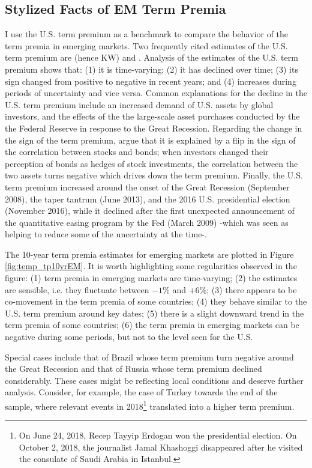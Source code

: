 {\subsection{Stylized Facts of EM Term Premia}
I use the U.S. term premium as a benchmark to compare the behavior of the term premia in emerging markets. Two frequently cited estimates of the U.S. term premium are \cite{KimWright:2005} (hence KW) and \cite*{ACM:2013}. Analysis of the estimates of the U.S. term premium shows that: (1) it is time-varying; (2) it has declined over time; (3) its sign changed from positive to negative in recent years; and (4) increases during periods of uncertainty and vice versa. Common explanations for the decline in the U.S. term premium include an increased demand of U.S. assets by global investors, and the effects of the the large-scale asset purchases conducted by the the Federal Reserve in response to the Great Recession. Regarding the change in the sign of the term premium, \cite*{CampbellSunderamViceira:2017} argue that it is explained by a flip in the sign of the correlation between stocks and bonds; when investors changed their perception of bonds as hedges of stock investments, the correlation between the two assets turns negative which drives down the term premium. Finally, the U.S. term premium increased around the onset of the Great Recession (September 2008), the taper tantrum (June 2013), and the 2016 U.S. presidential election (November 2016), while it declined after the first unexpected announcement of the quantitative easing program by the Fed (March 2009) -which was seen as helping to reduce some of the uncertainty at the time-.

The 10-year term premia estimates for emerging markets are plotted in Figure \ref{fig:temp_tp10yrEM}. It is worth highlighting some regularities observed in the figure: (1) term premia in emerging markets are time-varying; (2) the estimates are sensible, i.e. they fluctuate between $-1$\% and $+6$\%; (3) there appears to be co-movement in the term premia of some countries; (4) they behave similar to the U.S. term premium around key dates; (5) there is a slight downward trend in the term premia of some countries; (6) the term premia in emerging markets can be negative during some periods, but not to the level seen for the U.S.
	

Special cases include that of Brazil whose term premium turn negative around the Great Recession and that of Russia whose term premium declined considerably. These cases might be reflecting local conditions and deserve further analysis. Consider, for example, the case of Turkey towards the end of the sample, where relevant events in 2018\footnote{On June 24, 2018, Recep Tayyip Erdogan won the presidential election. On October 2, 2018, the journalist Jamal Khashoggi disappeared after he visited the consulate of Saudi Arabia in Istanbul.} translated into a higher term premium.

}
